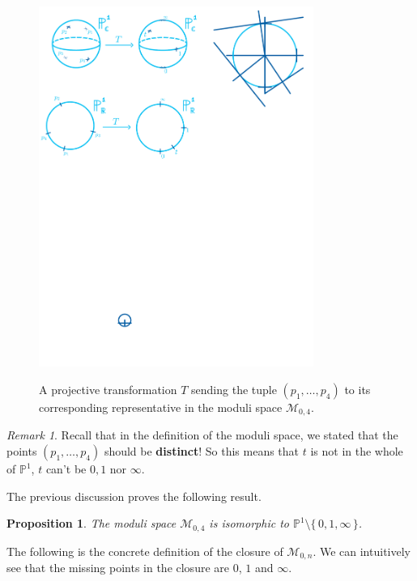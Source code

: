 \documentclass[11pt]{article}
\newcommand{\bP}{\mathbb{P}}
\newcommand{\cM}{\mathcal{M}}           %
\newcommand{\set}[1]{\{\,#1\,\}}    %
\newcommand{\less}{\setminus}           %
\newtheorem{Prop}{Proposition}         %
\theoremstyle{definition}
\theoremstyle{remark}
\newtheorem{Rmk}[Th]{Remark}      %
\numberwithin{theorem}{section}
\begin{document}
\begin{figure}[h!]
    \centering
    \includegraphics[width=0.8\textwidth, trim= 0.17cm 16.37cm 9.325cm 7.075cm,clip]{fig4.pdf}%
    \label{fig5}
    \caption{A projective transformation $T$ sending the tuple $(p_1,\dots,p_4)$ to its corresponding representative in the moduli space $\cM_{0,4}$.}
\end{figure}

\begin{Rmk}
Recall that in the definition of the moduli space, we stated that the points $(p_1,\dots,p_4)$ should be \textbf{distinct}! So this means that $t$ is not in the whole of $\bP^1$, $t$ can't be $0,1$ nor $\infty$. 
\end{Rmk}

The previous discussion proves the following result.

\begin{Prop}
    The moduli space $\cM_{0,4}$ is isomorphic to $\bP^1\less\set{0,1,\infty}$.
\end{Prop}

The following is the concrete definition of the closure of $\cM_{0,n}$. We can intuitively see that the missing points in the closure are $0$, $1$ and $\infty$.
\end{document}
